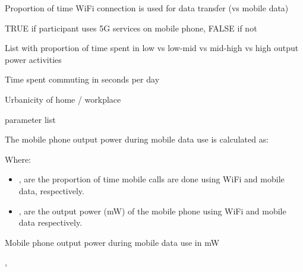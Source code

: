 \documentclass[a4paper]{book}
\begin{document}
\begin{Arguments}
\begin{ldescription}
\item[\code{wifi\_prop}] Proportion of time WiFi connection is used for data transfer (vs mobile data)

\item[\code{use\_5g}] TRUE if participant uses 5G services on mobile phone, FALSE if not

\item[\code{act\_pwr\_props}] List with proportion of time spent in low vs low-mid vs mid-high vs high output power activities

\item[\code{travel\_time}] Time spent commuting in seconds per day

\item[\code{urbanicity}] Urbanicity of home / workplace

\item[\code{params}] parameter list
\end{ldescription}
\end{Arguments}
%
\begin{Details}
The mobile phone output power during mobile data use is calculated as:

Where:
\begin{itemize}

\item{} ,  are the proportion of time mobile calls are done using WiFi and mobile data, respectively.
\item{} ,  are the output power (mW) of the mobile phone using WiFi and mobile data respectively.

\end{itemize}

\end{Details}
%
\begin{Value}
Mobile phone output power during mobile data use in mW
\end{Value}
%
\begin{SeeAlso}
, 
\end{SeeAlso}
%
\end{document}
